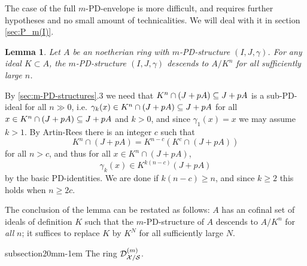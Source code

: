 \documentclass{article}
\makeatletter
\theoremstyle{change}
\newtheorem{lemma}[subsubsection]{Lemma}
\renewcommand{\subsection}{\@startsection%
{subsection}{2}{0mm}{\baselineskip}{-1em}%
{\normalfont\normalsize\bfseries}}
\numberwithin{equation}{subsubsection}
\newcommand{\demobox}{\vrule height6pt width6pt depth0pt}
\newenvironment{demo}{\noindent{\it Proof.}}
{{\unskip\nobreak\hfil\qquad
\demobox\parfillskip=0pt\par}
\medskip}
\newenvironment{remark}{\medskip\noindent{\textit{Remark.}}}{\medskip}
\makeatother
\begin{document}
The case of the full $m$-PD-envelope is more difficult, and requires
further hypotheses and no small amount of technicalities. We will deal
with it in section \ref{sec:P_m(I)}.

\begin{lemma}\label{lemma:passing-m-PD-to-quotient}
  Let $A$ be an noetherian ring with $m$-PD-structure
  $(I,J,\gamma)$. For any ideal $K\subset A$, the $m$-PD-structure
  $(I,J,\gamma)$ descends to $A/K^n$ for all sufficiently large $n$.
\end{lemma}
\begin{demo}
  By \ref{sec:m-PD-structures}.3 we need that
  $K^n\cap(J+pA)\subseteq J+pA$ is a sub-PD-ideal for all $n\gg0$,
  i.e. $\gamma_k(x)\in K^n\cap(J+pA)\subseteq J+pA$ for all
  $x\in K^n\cap(J+pA)\subseteq J+pA$ and $k>0$, and since $\gamma_1(x)=x$
  we may assume $k>1$. By Artin-Rees there is an integer $c$ such that
  \begin{displaymath}
    K^n\cap(J+pA)=K^{n-c}(K^c\cap(J+pA))
  \end{displaymath}
  for all $n>c$, and thus for all $x\in K^n\cap(J+pA)$, 
  \begin{displaymath}
    \gamma_k(x)\in K^{k(n-c)}(J+pA)
  \end{displaymath}
  by the basic PD-identities. We are done if $k(n-c)\ge n$, and since
  $k\ge2$ this holds when $n\ge 2c$.
\end{demo}

\begin{remark}
  The conclusion of the lemma can be restated as follows: $A$ has an
  cofinal set of ideals of definition $K$ such that the
  $m$-PD-structure of $A$ descends to $A/K^n$ for \textit{all} $n$; it
  suffices to replace $K$ by $K^N$ for all sufficiently large $N$.
\end{remark}


\subsection{The ring ${{\cal D}}^{({m})}_{{\cal X}/{\cal S}}$.}
\label{sec:diff-arith}
\end{document}
